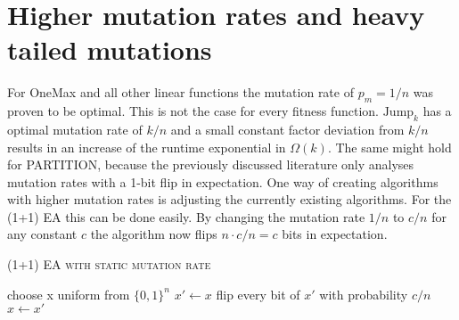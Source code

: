 \section{Higher mutation rates and heavy tailed mutations}
For OneMax and all other linear functions the mutation rate of $p_m=1/n$ was proven to be optimal\cite{witt2013tight}.
This is not the case for every fitness function.
$\text{Jump}_k$ has a optimal mutation rate of $k/n$ and a small constant factor deviation from $k/n$ results in an increase of the runtime exponential in $\Omega(k)$\cite{doerr2017fast}.
The same might hold for PARTITION, because the previously discussed literature only analyses mutation rates with a 1-bit flip in expectation.\newline
One way of creating algorithms with higher mutation rates is adjusting the currently existing algorithms.
For the (1+1) EA this can be done easily.
By changing the mutation rate $1/n$ to $c/n$ for any constant $c$ the algorithm now flips $n\cdot c/n=c$ bits in expectation.
\begin{algorithm}[bt]
      \caption{\textsc{(1+1) EA with static mutation rate}}\label{alg:EA_SM}

      \DontPrintSemicolon %

      \BlankLine
      choose x uniform from ${\{0,1\}}^n$\;
      {
      $x' \leftarrow x$\;
      flip every bit of $x'$ with probability $c/n$\;
      {
      {
            $x \leftarrow x'$\;
      }
      }
      }
\end{algorithm}

